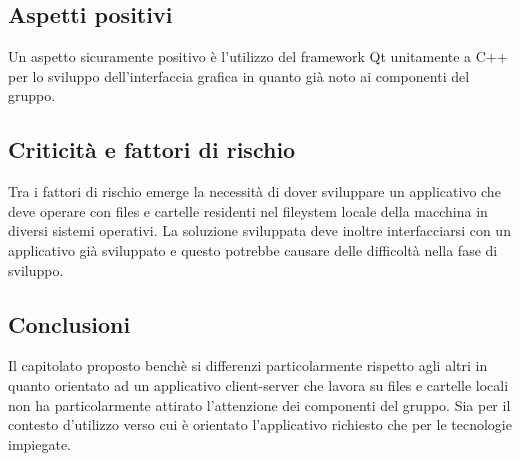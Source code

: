\subsection{Aspetti positivi}
Un aspetto sicuramente positivo è l’utilizzo del framework Qt unitamente a C++  per lo sviluppo dell’interfaccia grafica in quanto già noto ai componenti del gruppo.


\subsection{Criticità e fattori di rischio}
Tra i fattori di rischio emerge la necessità di dover sviluppare un applicativo che deve operare con files e cartelle residenti nel fileystem locale della macchina in diversi sistemi operativi.
La soluzione sviluppata deve inoltre interfacciarsi con un applicativo già sviluppato e questo potrebbe causare delle difficoltà nella fase di sviluppo.

\subsection{Conclusioni}
Il capitolato proposto benchè si differenzi particolarmente rispetto agli altri in quanto orientato ad un applicativo client-server che lavora su files e cartelle locali non ha particolarmente attirato l’attenzione dei componenti del gruppo. Sia per il contesto d'utilizzo verso cui è orientato l’applicativo richiesto che per le tecnologie impiegate.

\newpage
